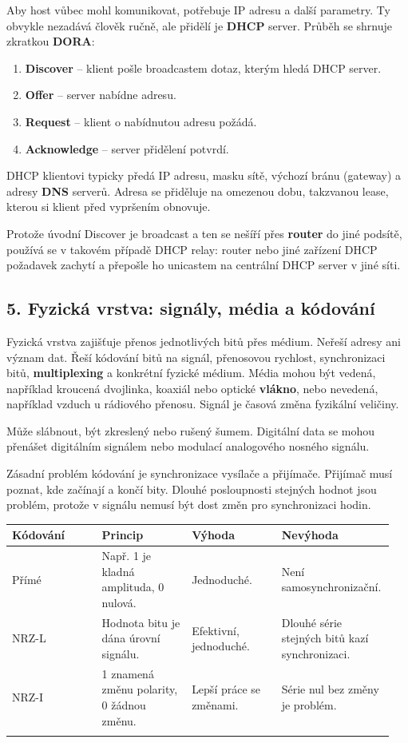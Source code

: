 \documentclass[11pt,a4paper]{article}
\begin{document}
Aby host vůbec mohl komunikovat, potřebuje IP adresu a další parametry. Ty obvykle nezadává člověk ručně, ale přidělí je \textbf{DHCP} server. Průběh se shrnuje zkratkou \textbf{DORA}:
\begin{enumerate}
  \item \textbf{Discover} -- klient pošle broadcastem dotaz, kterým hledá DHCP server.
  \item \textbf{Offer} -- server nabídne adresu.
  \item \textbf{Request} -- klient o nabídnutou adresu požádá.
  \item \textbf{Acknowledge} -- server přidělení potvrdí.
\end{enumerate}

DHCP klientovi typicky předá IP adresu, masku sítě, výchozí bránu (gateway) a adresy \textbf{DNS} serverů. Adresa se přiděluje na omezenou dobu, takzvanou lease, kterou si klient před vypršením obnovuje.

Protože úvodní Discover je broadcast a ten se nešíří přes \textbf{router} do jiné podsítě, používá se v takovém případě DHCP relay: router nebo jiné zařízení DHCP požadavek zachytí a přepošle ho unicastem na centrální DHCP server v jiné síti.

\subsection*{5. Fyzická vrstva: signály, média a kódování}

Fyzická vrstva zajišťuje přenos jednotlivých bitů přes médium. Neřeší adresy ani význam dat. Řeší kódování bitů na signál, přenosovou rychlost, synchronizaci bitů, \textbf{multiplexing} a konkrétní fyzické médium. Média mohou být vedená, například kroucená dvojlinka, koaxiál nebo optické \textbf{vlákno}, nebo nevedená, například vzduch u rádiového přenosu. Signál je časová změna fyzikální veličiny.

Může slábnout, být zkreslený nebo rušený šumem. Digitální data se mohou přenášet digitálním signálem nebo modulací analogového nosného signálu.

Zásadní problém kódování je synchronizace vysílače a přijímače. Přijímač musí poznat, kde začínají a končí bity. Dlouhé posloupnosti stejných hodnot jsou problém, protože v signálu nemusí být dost změn pro synchronizaci hodin.

\begin{longtable}{p{0.237\linewidth}p{0.237\linewidth}p{0.237\linewidth}p{0.237\linewidth}}
\toprule
\textbf{Kódování} & \textbf{Princip} & \textbf{Výhoda} & \textbf{Nevýhoda} \\
\midrule\endhead
Přímé & Např. 1 je kladná amplituda, 0 nulová. & Jednoduché. & Není samosynchronizační. \\
\addlinespace
NRZ-L & Hodnota bitu je dána úrovní signálu. & Efektivní, jednoduché. & Dlouhé série stejných bitů kazí synchronizaci. \\
\addlinespace
NRZ-I & 1 znamená změnu polarity, 0 žádnou změnu. & Lepší práce se změnami. & Série nul bez změny je problém. \\
\addlinespace
\bottomrule
\end{longtable}
\end{document}
